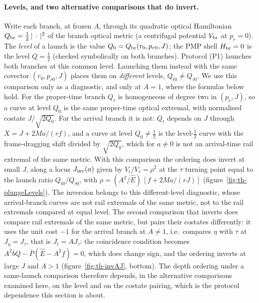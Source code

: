 \documentclass[12pt]{iopart}
\theoremstyle{plain}
\theoremstyle{definition}
\theoremstyle{remark}
\newcommand{\Ehat}{\hat E}
\begin{document}
\paragraph{Levels, and two alternative comparisons that do invert.} Write each branch, at frozen $A$, through
its quadratic optical Hamiltonian $Q_{\rm br}=\tfrac12\,|\,\cdot\,|^2$ of the branch optical
metric (a centrifugal potential $V_{\rm br}$ at $p_r=0$). The \emph{level} of a launch is the
value $Q_0=Q_{\rm br}(r_0,p_{r0},J)$; the PMP shell $H_{\rm br}=0$ is the level $Q=\tfrac12$
(checked symbolically on both branches). Protocol (P1) launches both branches at this common
level. Launching them instead with the same covector $(r_0,p_{r0},J)$ places them on
\emph{different} levels, $Q_{t0}\neq Q_{\tau0}$. We use this comparison only as a diagnostic, and
only at $A=1$, where the formulas below hold. For the proper-time branch $Q_\tau$ is
homogeneous of degree two in $(p_r,J)$, so a curve at level $Q_0$ is the same proper-time
optical extremal, with normalised costate $J/\sqrt{2Q_0}$. For the arrival branch it is not:
$Q_t$ depends on $J$ through $X=J+2Ma/(rf)$, and a curve at level $Q_0\neq\tfrac12$ is the level-$\tfrac12$ curve with the
frame-dragging shift divided by $\sqrt{2Q_0}$, which for $a\neq0$ is not an arrival-time rail
extremal of the same metric. With this comparison the ordering does invert at small $J$, along
a locus $J_{\rm inv}(a)$ given by $V_t/V_\tau=\rho^2$ at the $\tau$ turning point equal to the
launch ratio $Q_{t0}/Q_{\tau0}$, with
$\rho=(A^2/\Ehat)\,[f+2Ma/(rJ)]$ (figure~\ref{fig:th-plungeLevels}). The inversion belongs to
this different-level diagnostic, whose arrival-branch curves are not rail extremals of the
same metric, not to the rail extremals compared at equal level. The second comparison that
inverts does compare rail extremals of the same metric, but pairs their costates differently:
it uses the unit cost $-1$ for the arrival branch at $A\neq1$, i.e.\
compares $\eta$ with $\tau$ at $J_\eta=J_\tau$, that is $J_t=AJ_\tau$: the coincidence
condition becomes $A^2bQ-\bar P(\Ehat-A^2f)=0$, which does change sign, and the ordering
inverts at large $J$ and $A>1$ (figure~\ref{fig:th-invAJ}, bottom). The depth ordering under a
same-launch comparison therefore depends, in the alternative comparisons examined here, on the
level and on the costate pairing, which is the protocol dependence this section is about.
\end{document}

